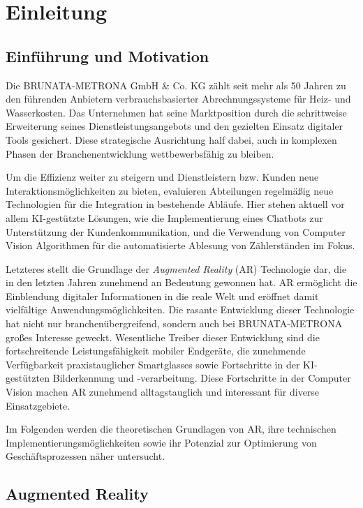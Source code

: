 \chapter{Einleitung}

\section{Einführung und Motivation}

Die BRUNATA-METRONA GmbH \& Co. KG zählt seit mehr als 50 Jahren zu den führenden Anbietern verbrauchsbasierter Abrechnungssysteme für Heiz- und Wasserkosten. Das Unternehmen hat seine Marktposition durch die schrittweise Erweiterung seines Dienstleistungsangebots und den gezielten Einsatz digitaler Tools gesichert. Diese strategische Ausrichtung half dabei, auch in komplexen Phasen der Branchenentwicklung wettbewerbsfähig zu bleiben.

Um die Effizienz weiter zu steigern und Dienstleistern bzw. Kunden neue Interaktionsmöglichkeiten zu bieten, evaluieren Abteilungen regelmäßig neue Technologien für die Integration in bestehende Abläufe. Hier stehen aktuell vor allem KI-gestützte Lösungen, wie die Implementierung eines Chatbots zur Unterstützung der Kundenkommunikation, und die Verwendung von Computer Vision Algorithmen für die automatisierte Ablesung von Zählerständen im Fokus.

Letzteres stellt die Grundlage der \textit{Augmented Reality} (AR) Technologie dar, die in den letzten Jahren zunehmend an Bedeutung gewonnen hat. AR ermöglicht die Einblendung digitaler Informationen in die reale Welt und eröffnet damit vielfältige Anwendungsmöglichkeiten. Die rasante Entwicklung dieser Technologie hat nicht nur branchenübergreifend, sondern auch bei BRUNATA-METRONA großes Interesse geweckt. Wesentliche Treiber dieser Entwicklung sind die fortschreitende Leistungsfähigkeit mobiler Endgeräte, die zunehmende Verfügbarkeit praxistauglicher Smartglasses sowie Fortschritte in der KI-gestützten Bilderkennung und -verarbeitung. Diese Fortschritte in der Computer Vision machen AR zunehmend alltagstauglich und interessant für diverse Einsatzgebiete. \cite{verma2022advances, boulanger2024applications, doerner2022virtual}

Im Folgenden werden die theoretischen Grundlagen von AR, ihre technischen Implementierungsmöglichkeiten sowie ihr Potenzial zur Optimierung von Geschäftsprozessen näher untersucht.

\section{Augmented Reality}

